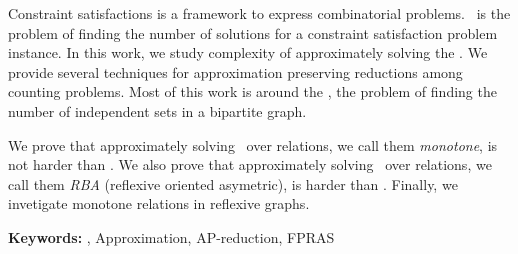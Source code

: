 
%
%

Constraint satisfactions is a framework to express combinatorial problems.
\ccsp\ is the problem of finding the number of solutions for a constraint satisfaction problem
instance. In this work, we study complexity of approximately solving the \ccsp\@. We
provide several techniques for approximation preserving reductions
among counting problems. Most of this work is around the \cbis,
the problem of finding the number of independent sets in a bipartite graph.

We prove that approximately solving \ccsp\ over relations, we call them \emph{monotone},
is not harder than \cbis\@. We also prove that approximately
solving \ccsp\ over relations, we call them \emph{RBA} (reflexive oriented asymetric), is harder than \cbis\@.
Finally, we invetigate monotone relations in reflexive graphs.

\vspace{1cm}

\noindent \textbf{Keywords:} \ccsp, Approximation, AP-reduction, FPRAS







